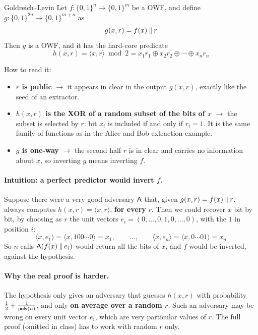 \begin{framedthm}[label={thm:gl}]{Goldreich--Levin}
  Let $f : \{0,1\}^n \to \{0,1\}^m$ be a OWF, and define $g : \{0,1\}^{2n} \to \{0,1\}^{m+n}$ as
  \[
    g(x, r) = f(x) \mathbin{\Vert} r
  \]
  Then $g$ is a OWF, and it has the hard-core predicate
  \[
    h(x, r) = \langle x, r \rangle \bmod 2 = x_1 r_1 \oplus x_2 r_2 \oplus \cdots \oplus x_n r_n
  \]
\end{framedthm}

How to read it:
\begin{itemize}
  \item \textbf{$r$ is public} $\to$ it appears in clear in the output $g(x, r)$, exactly like the seed of an extractor.
  \item \textbf{$h(x, r)$ is the XOR of a random subset of the bits of $x$} $\to$ the subset is selected by $r$: bit $x_i$ is included if and only if $r_i = 1$. It is the same family of functions as in the Alice and Bob extraction example.
  \item \textbf{$g$ is one-way} $\to$ the second half $r$ is in clear and carries no information about $x$, so inverting $g$ means inverting $f$.
\end{itemize}

\paragraph{Intuition: a perfect predictor would invert $f$.} Suppose there were a very good adversary $\mathsf{A}$ that, given $g(x, r) = f(x) \mathbin{\Vert} r$, always computes $h(x, r) = \langle x, r \rangle$, \textbf{for every} $r$. Then we could recover $x$ bit by bit, by choosing as $r$ the unit vectors $e_i = (0, \ldots, 0, 1, 0, \ldots, 0)$, with the $1$ in position $i$:
\[
  \langle x, e_1 \rangle = \langle x, 100\cdots0 \rangle = x_1, \qquad \ldots, \qquad \langle x, e_n \rangle = \langle x, 0\cdots01 \rangle = x_n
\]
So $n$ calls $\mathsf{A}(f(x) \mathbin{\Vert} e_i)$ would return all the bits of $x$, and $f$ would be inverted, against the hypothesis.

\paragraph{Why the real proof is harder.} The hypothesis only gives an adversary that guesses $h(x, r)$ with probability $\frac{1}{2} + \frac{1}{\mathsf{poly}(n)}$, and only \textbf{on average over a random $r$}. Such an adversary may be wrong on every unit vector $e_i$, which are very particular values of $r$. The full proof (omitted in class) has to work with random $r$ only.


